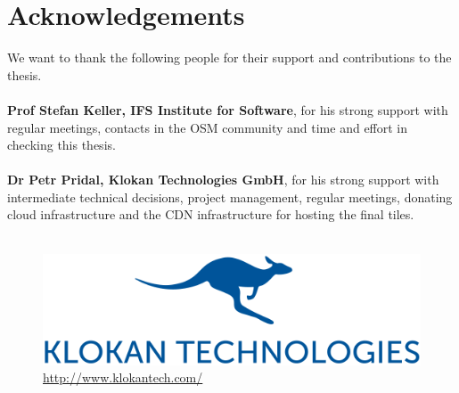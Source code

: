 

\bigskip


\begingroup

\let\clearpage\relax
\let\cleardoublepage\relax
\let\cleardoublepage\relax

\chapter*{Acknowledgements} %

We want to thank the following people for their support and contributions to the thesis.\\\\

\textbf{Prof Stefan Keller, IFS Institute for Software}, for his strong support with regular meetings, contacts in the OSM community and time and effort in checking this thesis.\\\\

\textbf{Dr Petr Pridal, Klokan Technologies GmbH}, for his strong support with intermediate technical decisions, project management, regular meetings, donating cloud infrastructure and the CDN infrastructure for hosting the final tiles.\\\\

\begin{figure}[H]
  \centering
  \includegraphics[scale=0.3]{images/klokantech_logo.png}
  \caption*{\url{http://www.klokantech.com/}}
\end{figure}
\endgroup

